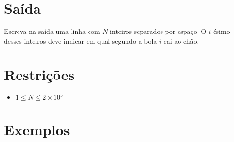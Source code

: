\section*{Saída}

Escreva na saída uma linha com $N$ inteiros separados por espaço.
O $i$-ésimo desses inteiros deve indicar em qual segundo a bola $i$ cai ao chão.

\section*{Restrições}

\begin{itemize}
\item $1 \leq N \leq 2 \times 10^{5}$
\end{itemize}

\section*{Exemplos}
\exemplo
